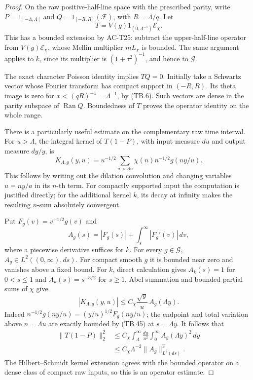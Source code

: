 \begin{proof}
On the raw positive-half-line space with the prescribed parity,
write \(P=1_{[-\Lambda,\Lambda]}\) and
\(Q=1_{[-R,R]}(\mathcal F)\), with \(R=\Lambda/q\).
Let
\[
       T=V(g)1_{(0,\Lambda^{-1})}\mathcal E_\chi .
\]
This has a bounded extension by AC-T25: subtract the
upper-half-line operator from \(V(g)\mathcal E_\chi\),
whose Mellin multiplier \(mL_\chi\) is bounded.
The same argument applies to \(k\), since its multiplier
is \((1+\tau^2)^{-1}\), and hence to \(\mathscr G\).

The exact character Poisson identity implies \(TQ=0\).
Initially take a Schwartz vector whose Fourier transform
has compact support in \((-R,R)\).  Its theta image is zero
for \(x<(qR)^{-1}=\Lambda^{-1}\), by (TB.6).
Such vectors are dense in the parity subspace of
\(\operatorname{Ran}Q\).  Boundedness of \(T\) proves the
operator identity on the whole range.

There is a particularly useful estimate on the complementary
raw time interval.  For \(u>\Lambda\), the integral kernel
of \(T(1-P)\), with input measure \(du\) and output measure
\(dy/y\), is
\[
 K_{\Lambda,g}(y,u)=u^{-1/2}
       \sum_{n>\Lambda u}\chi(n)n^{-1/2}g(ny/u).
 \tag{TB.44}
\]
This follows by writing out the dilation convolution and
changing variables \(u=ny/a\) in its \(n\)-th term.
For compactly supported input the computation is justified
directly; for the additional kernel \(k\), its decay at
infinity makes the resulting \(n\)-sum absolutely convergent.

Put \(F_g(v)=v^{-1/2}g(v)\) and
\[
 A_g(s)=|F_g(s)|+\int_s^\infty |F_g'(v)|\,dv ,
 \tag{TB.45}
\]
where a piecewise derivative suffices for \(k\).
For every \(g\in\mathscr G\), \(A_g\in L^2((0,\infty),ds)\).
For compact smooth \(g\) it is bounded near zero and vanishes
above a fixed bound.  For \(k\), direct calculation gives
\(A_k(s)=1\) for \(0<s\leq1\) and \(A_k(s)=s^{-3/2}\)
for \(s\geq1\).
Abel summation and bounded partial sums of \(\chi\) give
\[
 |K_{\Lambda,g}(y,u)|
       \leq C_\chi\frac{\sqrt y}{u}\,A_g(\Lambda y).
 \tag{TB.46}
\]
Indeed \(n^{-1/2}g(ny/u)=(y/u)^{1/2}F_g(ny/u)\);
the endpoint and total variation above \(n=\Lambda u\)
are exactly bounded by (TB.45) at \(s=\Lambda y\).
It follows that
\[
 \begin{split}
 \|T(1-P)\|_2^2
 &\leq C_\chi
       \int_\Lambda^\infty\frac{du}{u^2}
       \int_0^\infty A_g(\Lambda y)^2\,dy\\
 &\leq C_\chi\Lambda^{-2}\|A_g\|_{L^2(ds)}^2.
 \end{split}
 \tag{TB.47}
\]
The Hilbert--Schmidt kernel extension agrees with the
bounded operator on a dense class of compact raw inputs,
so this is an operator estimate.


\end{proof}
